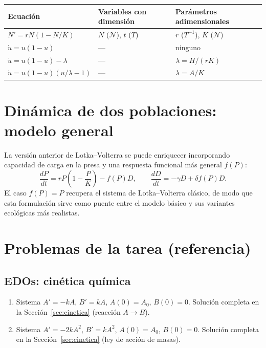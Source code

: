 \documentclass[11pt,letterpaper]{article}
\begin{document}
\begin{center}
\begin{tabular}{lll}
\toprule
Ecuación & Variables con dimensión & Parámetros adimensionales\\
\midrule
$N'=rN(1-N/K)$ & $N$ ($\mathcal{N}$), $t$ ($T$) & $r$ ($T^{-1}$), $K$ ($\mathcal{N}$)\\
$\dot{u}=u(1-u)$ & --- & ninguno\\
$\dot{u}=u(1-u)-\lambda$ & --- & $\lambda=H/(rK)$\\
$\dot{u}=u(1-u)(u/\lambda-1)$ & --- & $\lambda=A/K$\\
\bottomrule
\end{tabular}
\end{center}

\section{Dinámica de dos poblaciones: modelo general}
\label{sec:modelo-general-dos-poblaciones}

La versión anterior de Lotka--Volterra se puede enriquecer incorporando
capacidad de carga en la presa y una respuesta funcional más general
$f(P)$:
\[
\frac{dP}{dt}=rP\!\left(1-\frac{P}{K}\right)-f(P)D,\qquad
\frac{dD}{dt}=-\gamma D+\delta f(P)D.
\]
El caso $f(P)=P$ recupera el sistema de Lotka--Volterra clásico, de modo que
esta formulación sirve como puente entre el modelo básico y sus variantes
ecológicas más realistas.

\section{Problemas de la tarea (referencia)}
\label{sec:tarea-referencia}

\subsection{EDOs: cinética química}

\begin{enumerate}
\item Sistema $A'=-kA$, $B'=kA$, $A(0)=A_0$, $B(0)=0$.
      Solución completa en la Sección~\ref{sec:cinetica} (reacción $A\to B$).
\item Sistema $A'=-2kA^2$, $B'=kA^2$, $A(0)=A_0$, $B(0)=0$.
      Solución completa en la Sección~\ref{sec:cinetica} (ley de acción de masas).
\end{enumerate}
\end{document}
